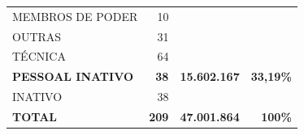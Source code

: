 \documentclass{article}
\begin{document}
\begin{longtable}[c]{m{7cm}|m{2.5cm}|m{2.5cm}|m{2.5cm}}
\multicolumn{1}{L{7cm}|}{ \hspace{3em} MEMBROS DE PODER} & \multicolumn{1}{r|}{ 10} &  & \\
\multicolumn{1}{L{7cm}|}{ \hspace{3em} OUTRAS} & \multicolumn{1}{r|}{ 31} &  & \\
\multicolumn{1}{L{7cm}|}{ \hspace{3em} TÉCNICA} & \multicolumn{1}{r|}{ 64} &  & \\
\multicolumn{1}{L{7cm}|}{ \textbf{PESSOAL INATIVO}} & \multicolumn{1}{r|}{ \textbf{38}} & \multicolumn{1}{r|}{ \textbf{15.602.167}} & \multicolumn{1}{r}{ \textbf{33,19\%}} \\
\multicolumn{1}{L{7cm}|}{ \hspace{3em} INATIVO} & \multicolumn{1}{r|}{ 38} &  & \\
\hline \hline 
\multicolumn{1}{L{7cm}|}{ \textbf{TOTAL}} & \multicolumn{1}{r|}{ \textbf{209}} & \multicolumn{1}{r|}{ \textbf{47.001.864}} & \multicolumn{1}{r}{ \textbf{100\%}} \\
\end{longtable}
\newpage
\small
\end{document}
